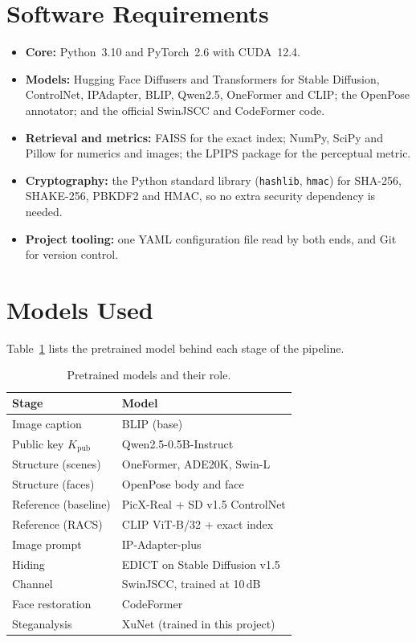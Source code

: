 \section{Software Requirements}
\begin{itemize}
	\item \textbf{Core:} Python~3.10 and PyTorch~2.6 with CUDA~12.4.
	\item \textbf{Models:} Hugging Face Diffusers and Transformers for Stable Diffusion,
	ControlNet, IPAdapter, BLIP, Qwen2.5, OneFormer and CLIP; the OpenPose annotator; and the
	official SwinJSCC and CodeFormer code.
	\item \textbf{Retrieval and metrics:} FAISS for the exact index; NumPy, SciPy and Pillow for
	numerics and images; the LPIPS package for the perceptual metric.
	\item \textbf{Cryptography:} the Python standard library (\texttt{hashlib}, \texttt{hmac}) for
	SHA-256, SHAKE-256, PBKDF2 and HMAC, so no extra security dependency is needed.
	\item \textbf{Project tooling:} one YAML configuration file read by both ends, and Git for
	version control.
\end{itemize}

\section{Models Used}
Table~\ref{tab:models} lists the pretrained model behind each stage of the pipeline.
\begin{table}[htbp]
	\centering
	\caption{Pretrained models and their role.}
	\label{tab:models}
	\begin{tabularx}{0.9\textwidth}{|l|X|}
		\hline
		\textbf{Stage} & \textbf{Model} \\ \hline
		Image caption & BLIP (base) \\ \hline
		Public key $K_{\mathrm{pub}}$ & Qwen2.5-0.5B-Instruct \\ \hline
		Structure (scenes) & OneFormer, ADE20K, Swin-L \\ \hline
		Structure (faces) & OpenPose body and face \\ \hline
		Reference (baseline) & PicX-Real + SD v1.5 ControlNet \\ \hline
		Reference (RACS) & CLIP ViT-B/32 + exact index \\ \hline
		Image prompt & IP-Adapter-plus \\ \hline
		Hiding & EDICT on Stable Diffusion v1.5 \\ \hline
		Channel & SwinJSCC, trained at 10\,dB \\ \hline
		Face restoration & CodeFormer \\ \hline
		Steganalysis & XuNet (trained in this project) \\ \hline
	\end{tabularx}
\end{table}

